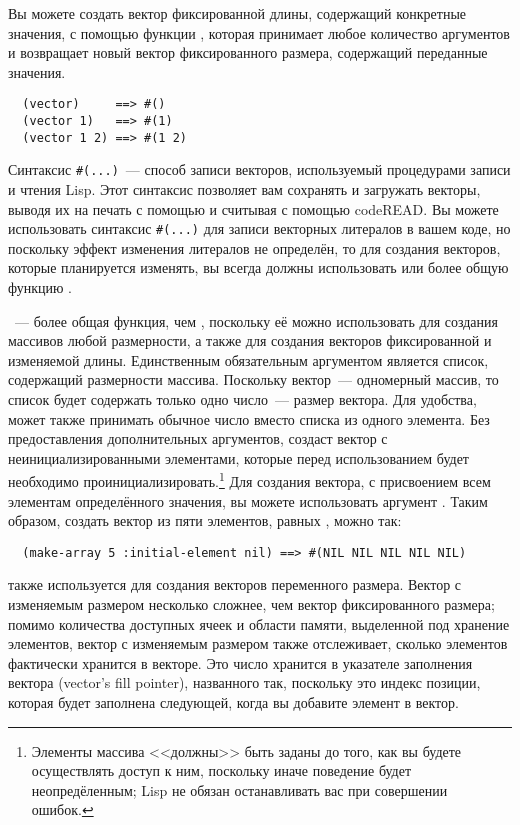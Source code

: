 Вы можете создать вектор фиксированной длины, содержащий конкретные значения, с помощью
функции , которая принимает любое количество аргументов и возвращает
новый вектор фиксированного размера, содержащий переданные значения.

\begin{verbatim}
  (vector)     ==> #()
  (vector 1)   ==> #(1)
  (vector 1 2) ==> #(1 2)
\end{verbatim}

Синтаксис \lstinline!#(...)!~--- способ записи векторов, используемый процедурами
записи и чтения Lisp.  Этот синтаксис позволяет вам сохранять и загружать векторы,
выводя их на печать с помощью  и считывая с помощью code{READ}.
Вы можете использовать синтаксис \lstinline!#(...)! для
записи векторных литералов в вашем коде, но поскольку эффект изменения литералов не определён,
то для создания векторов, которые планируется изменять, вы всегда должны 
использовать  или более общую функцию .

~--- более общая функция, чем , поскольку её можно
использовать для создания массивов любой размерности, а также для создания векторов
фиксированной и изменяемой длины. Единственным обязательным аргументом 
является список, содержащий размерности массива.  Поскольку вектор~--- одномерный массив,
то список будет содержать только одно число~--- размер вектора.  Для удобства,
 может также принимать обычное число вместо списка из одного элемента.
Без предоставления дополнительных аргументов,  создаст вектор с
неинициализированными элементами, которые перед использованием будет необходимо
проинициализировать.\footnote{Элементы массива <<должны>> быть заданы до того, как вы будете осуществлять
  доступ к ним, поскольку иначе поведение будет неопредёленным; Lisp не обязан
  останавливать вас при совершении ошибок.}  Для создания вектора, с присвоением всем
элементам определённого значения, вы можете использовать аргумент .
Таким образом, создать вектор из пяти элементов, равных , можно так:

\begin{verbatim}
  (make-array 5 :initial-element nil) ==> #(NIL NIL NIL NIL NIL)
\end{verbatim}

 также используется для создания векторов переменного размера.
Вектор с изменяемым размером несколько сложнее, чем вектор фиксированного размера;
помимо количества доступных ячеек и области памяти, выделенной под хранение элементов,
вектор с изменяемым размером также отслеживает, сколько элементов фактически
хранится в векторе.  Это число хранится в указателе заполнения вектора (vector's fill
pointer), названного так, поскольку это индекс позиции, которая будет заполнена следующей,
когда вы добавите элемент в вектор.

